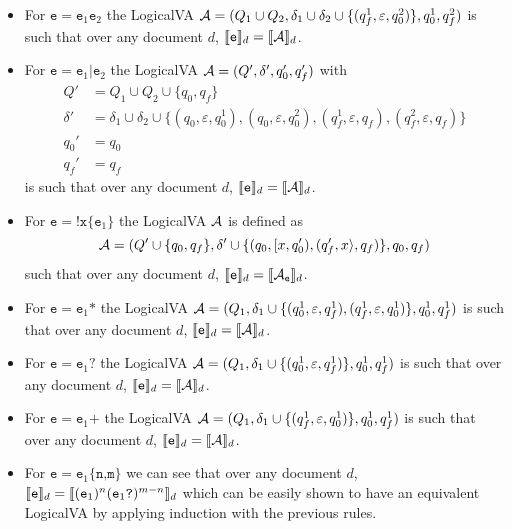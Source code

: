 \begin{itemize}
	\item For $\texttt{e} = \texttt{e}_1\texttt{e}_2$ the LogicalVA $\mathcal{A} = (Q_1
	\cup Q_2, \delta_1 \cup \delta_2 \cup \{(q_f^1, \varepsilon, q_0^2)\},
	q_0^1, q_f^2)$ is such that over any document $d$, $\llbracket\texttt{e}\rrbracket_d =
	\llbracket\mathcal{A}\rrbracket_d$.
	\item For $\texttt{e} = \texttt{e}_1\texttt{|}\texttt{e}_2$ the LogicalVA
	$\mathcal{A} = (Q', \delta', q_0', q_f')$ with
	      \begin{align*}
		      Q'      & = Q_1 \cup Q_2 \cup \{q_0, q_f\} \\
		      \delta' & = \delta_1 \cup \delta_2 \cup \{(q_0, \varepsilon, q_0^1), (q_0, \varepsilon, q_0^2), (q_f^1, \varepsilon, q_f), (q_f^2, \varepsilon, q_f) \} \\
		      q_0'    & = q_0                                                                                                                                         \\
		      q_f'    & = q_f
	      \end{align*}
	      is such that over any document $d$, $\llbracket\texttt{e}\rrbracket_d =
	      \llbracket\mathcal{A}\rrbracket_d$.
	\item For $\texttt{e} = \texttt{!x\{}\texttt{e}_1\texttt{\}}$ the LogicalVA
	$\mathcal{A}$ is defined as
	      \[
		      \mathcal{A} = (Q' \cup \{q_0, q_f\},\delta' \cup \{(q_0, [x, q_0'), (q_f', x\rangle, q_f)\}, q_0, q_f)
	      \]
	      such that over any document $d$, $\llbracket\texttt{e}\rrbracket_d =
	      \llbracket\mathcal{A}_\texttt{e}\rrbracket_d$.
	\item For $\texttt{e} = \texttt{e}_1\texttt{*}$ the LogicalVA $\mathcal{A} = (Q_1,
	\delta_1 \cup \{(q_0^1, \varepsilon, q_f^1), (q_f^1, \varepsilon, q_0^1)\},
	q_0^1, q_f^1)$ is such that over any document $d$, $\llbracket\texttt{e}\rrbracket_d =
	\llbracket\mathcal{A}\rrbracket_d$.
	\item For $\texttt{e} = \texttt{e}_1\texttt{?}$ the LogicalVA $\mathcal{A} = (Q_1,
	\delta_1 \cup \{(q_0^1, \varepsilon, q_f^1)\}, q_0^1, q_f^1)$ is such that
	over any document $d$, $\llbracket\texttt{e}\rrbracket_d = \llbracket\mathcal{A}\rrbracket_d$.
	\item For $\texttt{e} = \texttt{e}_1\texttt{+}$ the LogicalVA $\mathcal{A} = (Q_1,
	\delta_1 \cup \{(q_f^1, \varepsilon, q_0^1)\}, q_0^1, q_f^1)$ is such that
	over any document $d$, $\llbracket\texttt{e}\rrbracket_d = \llbracket\mathcal{A}\rrbracket_d$.
	\item For $\texttt{e} = \texttt{e}_1\texttt{\{n,m\}}$ we can see that over
	any document $d$, $\llbracket\texttt{e}\rrbracket_d =
	\llbracket(\texttt{e}_1)^n(\texttt{e}_1\texttt{?})^{m-n}\rrbracket_d$ which can be easily
	shown to have an equivalent LogicalVA by applying induction with the
	previous rules.
\end{itemize}